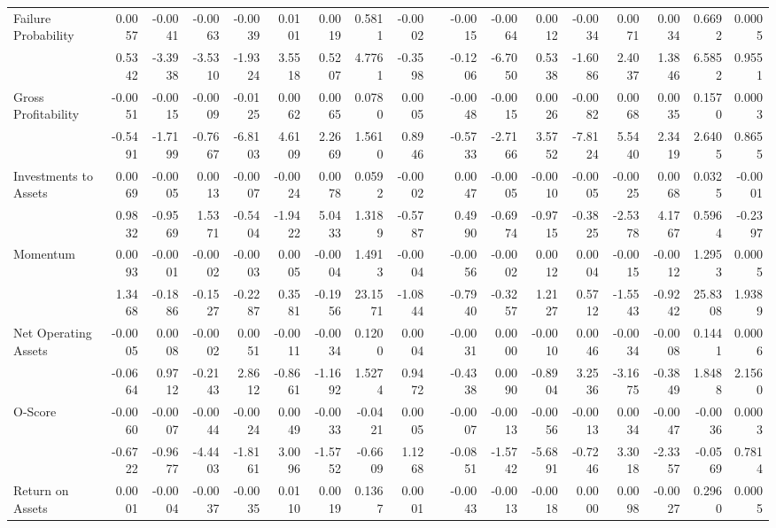 \begin{sidewaystable}[htbp]
{\begin{tabular}{lrrrrrrrrrrrrrrrrr}
Failure Probability & 0.0057 & -0.0041 & -0.0063 & -0.0039 & 0.0101 & 0.0019 & 0.5811 & -0.0002 &       & -0.0015 & -0.0064 & 0.0012 & -0.0034 & 0.0071 & 0.0034 & 0.6692 & 0.0005 \\
& 0.5342 & -3.3938 & -3.5310 & -1.9324 & 3.5518 & 0.5207 & 4.7761 & -0.3598 &       & -0.1206 & -6.7050 & 0.5338 & -1.6086 & 2.4037 & 1.3846 & 6.5852 & 0.9551 \\
Gross Profitability & -0.0051 & -0.0015 & -0.0009 & -0.0125 & 0.0062 & 0.0065 & 0.0780 & 0.0005 &       & -0.0048 & -0.0015 & 0.0026 & -0.0082 & 0.0068 & 0.0035 & 0.1570 & 0.0003 \\
& -0.5491 & -1.7199 & -0.7667 & -6.8103 & 4.6109 & 2.2669 & 1.5610 & 0.8946 &       & -0.5733 & -2.7166 & 3.5752 & -7.8124 & 5.5440 & 2.3419 & 2.6405 & 0.8655 \\
Investments to Assets & 0.0069 & -0.0005 & 0.0013 & -0.0007 & -0.0024 & 0.0078 & 0.0592 & -0.0002 &       & 0.0047 & -0.0005 & -0.0010 & -0.0005 & -0.0025 & 0.0068 & 0.0325 & -0.0001 \\
& 0.9832 & -0.9569 & 1.5371 & -0.5404 & -1.9422 & 5.0433 & 1.3189 & -0.5787 &       & 0.4990 & -0.6974 & -0.9715 & -0.3825 & -2.5378 & 4.1767 & 0.5964 & -0.2397 \\
Momentum & 0.0093 & -0.0001 & -0.0002 & -0.0003 & 0.0005 & -0.0004 & 1.4913 & -0.0004 &       & -0.0056 & -0.0002 & 0.0012 & 0.0004 & -0.0015 & -0.0012 & 1.2953 & 0.0005 \\
& 1.3468 & -0.1886 & -0.1527 & -0.2287 & 0.3581 & -0.1956 & 23.1571 & -1.0844 &       & -0.7940 & -0.3257 & 1.2127 & 0.5712 & -1.5543 & -0.9242 & 25.8308 & 1.9389 \\
Net Operating Assets & -0.0005 & 0.0008 & -0.0002 & 0.0051 & -0.0011 & -0.0034 & 0.1200 & 0.0004 &       & -0.0031 & 0.0000 & -0.0010 & 0.0046 & -0.0034 & -0.0008 & 0.1441 & 0.0006 \\
& -0.0664 & 0.9712 & -0.2143 & 2.8612 & -0.8661 & -1.1692 & 1.5274 & 0.9472 &       & -0.4338 & 0.0090 & -0.8904 & 3.2536 & -3.1675 & -0.3849 & 1.8488 & 2.1560 \\
O-Score & -0.0060 & -0.0007 & -0.0044 & -0.0024 & 0.0049 & -0.0033 & -0.0421 & 0.0005 &       & -0.0007 & -0.0013 & -0.0056 & -0.0013 & 0.0034 & -0.0047 & -0.0036 & 0.0003 \\
& -0.6722 & -0.9677 & -4.4403 & -1.8161 & 3.0096 & -1.5752 & -0.6609 & 1.1268 &       & -0.0851 & -1.5742 & -5.6891 & -0.7246 & 3.3018 & -2.3357 & -0.0569 & 0.7814 \\
Return on Assets & 0.0001 & -0.0004 & -0.0037 & -0.0035 & 0.0110 & 0.0019 & 0.1367 & 0.0001 &       & -0.0043 & -0.0013 & -0.0018 & 0.0000 & 0.0098 & -0.0027 & 0.2960 & 0.0005 \\

\end{tabular}}
\end{sidewaystable}
